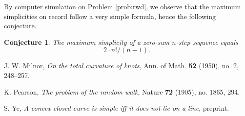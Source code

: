 \documentclass{amsart}
\newtheorem{conjecture}[proposition]{Conjecture}
\theoremstyle{definition}
\theoremstyle{problem}
\theoremstyle{remark}
\begin{document}
By computer simulation on Problem \ref{prob:rwd}, we observe that the maximum
simplicities on record follow a very simple formula, hence the following conjecture.

\begin{conjecture}
    \label{con:value_formula}
    The maximum simplicity of a zero-sum $n$-step sequence
    equals \[2\cdot n!/(n-1).\]
\end{conjecture}

\begin{thebibliography}{9}

    J. W. Milnor,
    \emph{On the total curvature of knots},
    Ann. of Math.
    \textbf{52} (1950), no. 2, 248--257.

    K. Pearson,
    \emph{The problem of the random walk},
    Nature \textbf{72} (1905), no. 1865, 294.

    S. Ye,
    \emph{A convex closed curve is simple iff it does not lie on a line},
    preprint.

\end{thebibliography}
\end{document}
